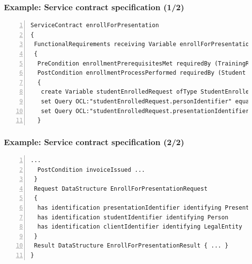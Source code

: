 
\begin{frame}[fragile]
\frametitle{Example: Service contract specification (1/2)}

\lstset{language=urdad,label=contractTextSyntax}
\begin{lstlisting}[numbers=left,escapechar=|]
ServiceContract enrollForPresentation
{
 FunctionalRequirements receiving Variable enrollForPresentationRequest ofType EnrollForPresentationRequest
 {
  PreCondition enrollmentPrerequisitesMet requiredBy (TrainingRegulator Student) raises EnrollmentPrerequisitesNotSatisfiedException checks constraint enrollmentPrerequisitesForPresentationMet with ValueOf enrollForPresentationRequest
  PostCondition enrollmentProcessPerformed requiredBy (Student Client TrainingRegulator) ensures constraint studentEnrolledForPresentation          with ValueOf studentEnrolledRequest constructedUsing doSequential
  {
   create Variable studentEnrolledRequest ofType StudentEnrolledRequest
   set Query OCL:"studentEnrolledRequest.personIdentifier" equalTo Query OCL:"enrollForPresentationRequest.personIdentifier"                            
   set Query OCL:"studentEnrolledRequest.presentationIdentifier" equalTo Query OCL:"enrollForPresentationRequest.presentationIdentifier"                            
  }  

\end{lstlisting}
\end{frame}

\begin{frame}[fragile]
\frametitle{Example: Service contract specification (2/2)}
          
\lstset{language=urdad,label=contractTextSyntax2}
\begin{lstlisting}[numbers=left,escapechar=|]
  ...
  PostCondition invoiceIssued ...
 }            
 Request DataStructure EnrollForPresentationRequest 
 {
  has identification presentationIdentifier identifying Presentation
  has identification studentIdentifier identifying Person
  has identification clientIdentifier identifying LegalEntity         
 }
 Result DataStructure EnrollForPresentationResult { ... } 
}
\end{lstlisting}
\end{frame}


